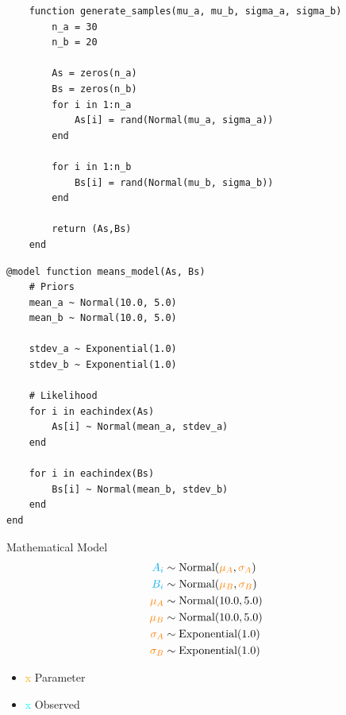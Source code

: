 \documentclass[aspectratio=169,xcolor=svgnames]{beamer}
\begin{document}
\newcommand{\parameter}[1]{\textcolor{orange}{#1}}
\newcommand{\observed}[1]{\textcolor{cyan}{#1}}

\newcommand{\normal}[1]{\text{Normal}(#1)}
\newcommand{\exponential}[1]{\text{Exponential}(#1)}

\begin{frame}[fragile]

    \begin{verbatim}
    function generate_samples(mu_a, mu_b, sigma_a, sigma_b)
        n_a = 30
        n_b = 20

        As = zeros(n_a)
        Bs = zeros(n_b)
        for i in 1:n_a
            As[i] = rand(Normal(mu_a, sigma_a))
        end

        for i in 1:n_b
            Bs[i] = rand(Normal(mu_b, sigma_b))
        end

        return (As,Bs)
    end
    \end{verbatim}
\end{frame}

\begin{frame}[fragile]
  \begin{verbatim}
@model function means_model(As, Bs)
    # Priors
    mean_a ~ Normal(10.0, 5.0)
    mean_b ~ Normal(10.0, 5.0)

    stdev_a ~ Exponential(1.0)
    stdev_b ~ Exponential(1.0)

    # Likelihood
    for i in eachindex(As)
        As[i] ~ Normal(mean_a, stdev_a)
    end

    for i in eachindex(Bs)
        Bs[i] ~ Normal(mean_b, stdev_b)
    end
end
  \end{verbatim}
\end{frame}

\begin{frame}{Mathematical Model}
  \begin{align*}
    \observed{A_i} &\sim \normal{\parameter{\mu_A}, \parameter{\sigma_A}}\\
    \observed{B_i} &\sim \normal{\parameter{\mu_B}, \parameter{\sigma_B}}\\
    \parameter{\mu_A} &\sim \normal{10.0, 5.0}\\
    \parameter{\mu_B} &\sim \normal{10.0, 5.0}\\
    \parameter{\sigma_A} &\sim \exponential{1.0}\\
    \parameter{\sigma_B} &\sim \exponential{1.0}\\
  \end{align*}

  \begin{itemize}
  \item \parameter{x} Parameter
  \item \observed{x} Observed
  \end{itemize}
\end{frame}
\end{document}
